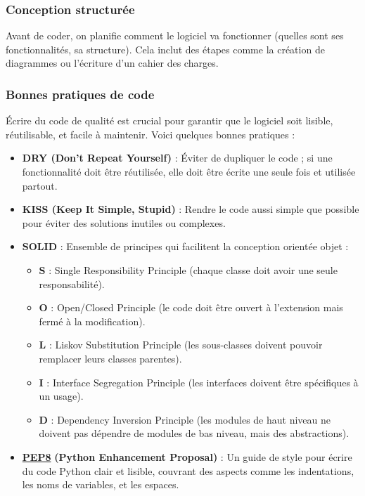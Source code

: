 \documentclass[
  letterpaper,
  DIV=11,
  numbers=noendperiod]{scrartcl}
\begin{document}
\subsubsection{Conception structurée}\label{conception-structuruxe9e}

Avant de coder, on planifie comment le logiciel va fonctionner (quelles
sont ses fonctionnalités, sa structure). Cela inclut des étapes comme la
création de diagrammes ou l'écriture d'un cahier des charges.

\subsubsection{Bonnes pratiques de code}\label{bonnes-pratiques-de-code}

Écrire du code de qualité est crucial pour garantir que le logiciel soit
lisible, réutilisable, et facile à maintenir. Voici quelques bonnes
pratiques :

\begin{itemize}
\item
  \textbf{DRY (Don't Repeat Yourself)} : Éviter de dupliquer le code ;
  si une fonctionnalité doit être réutilisée, elle doit être écrite une
  seule fois et utilisée partout.
\item
  \textbf{KISS (Keep It Simple, Stupid)} : Rendre le code aussi simple
  que possible pour éviter des solutions inutiles ou complexes.
\item
  \textbf{SOLID} : Ensemble de principes qui facilitent la conception
  orientée objet :

  \begin{itemize}
  \item
    \textbf{S} : Single Responsibility Principle (chaque classe doit
    avoir une seule responsabilité).
  \item
    \textbf{O} : Open/Closed Principle (le code doit être ouvert à
    l'extension mais fermé à la modification).
  \item
    \textbf{L} : Liskov Substitution Principle (les sous-classes doivent
    pouvoir remplacer leurs classes parentes).
  \item
    \textbf{I} : Interface Segregation Principle (les interfaces doivent
    être spécifiques à un usage).
  \item
    \textbf{D} : Dependency Inversion Principle (les modules de haut
    niveau ne doivent pas dépendre de modules de bas niveau, mais des
    abstractions).
  \end{itemize}
\item
  \href{https://peps.python.org/pep-0008/}{\textbf{PEP8}}
  \textbf{(Python Enhancement Proposal)} : Un guide de style pour écrire
  du code Python clair et lisible, couvrant des aspects comme les
  indentations, les noms de variables, et les espaces.
\end{itemize}
\end{document}
